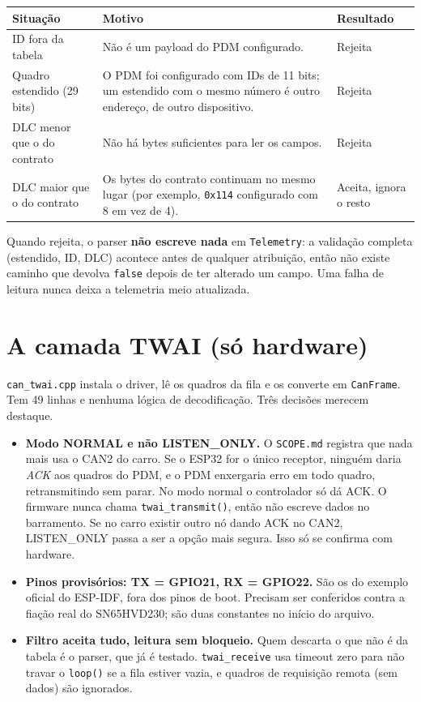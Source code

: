 \documentclass[11pt,a4paper]{article}
\begin{document}
\begin{center}
\begin{tabularx}{\textwidth}{lXl}
\toprule
\textbf{Situação} & \textbf{Motivo} & \textbf{Resultado} \\
\midrule
ID fora da tabela & Não é um payload do PDM configurado. & Rejeita \\
Quadro estendido (29 bits) & O PDM foi configurado com IDs de 11 bits; um estendido com o mesmo número é outro endereço, de outro dispositivo. & Rejeita \\
DLC menor que o do contrato & Não há bytes suficientes para ler os campos. & Rejeita \\
DLC maior que o do contrato & Os bytes do contrato continuam no mesmo lugar (por exemplo, \texttt{0x114} configurado com 8 em vez de 4). & Aceita, ignora o resto \\
\bottomrule
\end{tabularx}
\end{center}

Quando rejeita, o parser \textbf{não escreve nada} em \texttt{Telemetry}: a validação completa (estendido, ID, DLC) acontece antes de qualquer atribuição, então não existe caminho que devolva \texttt{false} depois de ter alterado um campo. Uma falha de leitura nunca deixa a telemetria meio atualizada.

\section{A camada TWAI (só hardware)}

\texttt{can\_twai.cpp} instala o driver, lê os quadros da fila e os converte em \texttt{CanFrame}. Tem 49 linhas e nenhuma lógica de decodificação. Três decisões merecem destaque.

\begin{itemize}
    \item \textbf{Modo NORMAL e não LISTEN\_ONLY.} O \texttt{SCOPE.md} registra que nada mais usa o CAN2 do carro. Se o ESP32 for o único receptor, ninguém daria \emph{ACK} aos quadros do PDM, e o PDM enxergaria erro em todo quadro, retransmitindo sem parar. No modo normal o controlador só dá ACK. O firmware nunca chama \texttt{twai\_transmit()}, então não escreve dados no barramento. Se no carro existir outro nó dando ACK no CAN2, LISTEN\_ONLY passa a ser a opção mais segura. Isso só se confirma com hardware.
    \item \textbf{Pinos provisórios: TX = GPIO21, RX = GPIO22.} São os do exemplo oficial do ESP-IDF, fora dos pinos de boot. Precisam ser conferidos contra a fiação real do SN65HVD230; são duas constantes no início do arquivo.
    \item \textbf{Filtro aceita tudo, leitura sem bloqueio.} Quem descarta o que não é da tabela é o parser, que já é testado. \texttt{twai\_receive} usa timeout zero para não travar o \texttt{loop()} se a fila estiver vazia, e quadros de requisição remota (sem dados) são ignorados.
\end{itemize}
\end{document}
